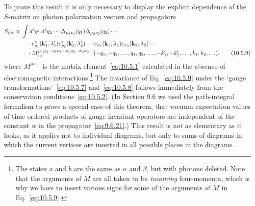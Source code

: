 To prove this result it is only necessary to display the explicit dependence
of the $S$-matrix on photon polarization vectors and propagators
\begin{align}
  S_{\beta\alpha}\propto{}&
  \int d^4q_1\,d^4q_2\cdots
  \Delta_{\mu_1\nu_1}(q_1)\Delta_{\mu_2\nu_2}(q_2)\cdots \notag\\
  &\quad\cdot
  e^*_{\rho_1}(\mathbf{k}'_1,\lambda'_1)
  e^*_{\rho_2}(\mathbf{k}'_2,\lambda'_2)\cdots
  e_{\sigma_1}(\mathbf{k}_1,\lambda_1)
  e_{\sigma_2}(\mathbf{k}_2,\lambda_2)\cdots \notag\\
  &\quad\cdot
  M_{ba}^{\mu_1\mu_2\cdots\nu_1\nu_2\cdots
  \rho_1\rho_2\cdots\sigma_1\sigma_2\cdots}
  (-q_1,-q_2,\ldots,q_1,q_2,\ldots,
  -k'_1,-k'_2,\ldots,k_1,k_2,\ldots).
  \tag{10.5.9}\label{eq:10.5.9}
\end{align}
where $M^{\mu\sigma\cdots}$ is the matrix element~\eqref{eq:10.5.1}
calculated in the absence of electromagnetic interactions.\footnote{The
states $a$ and $b$ are the same as $\alpha$ and $\beta$, but with photons
deleted. Note that the arguments of $M$ are all taken to be \emph{incoming}
four-momenta, which is why we have to insert various signs for some of the
arguments of $M$ in Eq.~\eqref{eq:10.5.9}.} The invariance of
Eq.~\eqref{eq:10.5.9} under the `gauge transformations'~\eqref{eq:10.5.7}
and~\eqref{eq:10.5.8} follows immediately from the conservation
conditions~\eqref{eq:10.5.2}. (In Section 9.6 we used the path-integral
formalism to prove a special case of this theorem, that vacuum expectation
values of time-ordered products of gauge-invariant operators are independent
of the constant $\alpha$ in the propagator~\eqref{eq:9.6.21}.) This result is
not as elementary as it looks, as it applies not to individual diagrams, but
only to sums of diagrams in which the current vertices are inserted in all
possible places in the diagrams.

